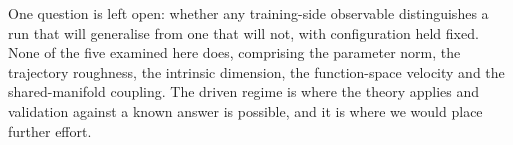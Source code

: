 \documentclass{article}
\begin{document}
One question is left open: whether any training-side observable distinguishes a run that
will generalise from one that will not, with configuration held fixed. None of the five
examined here does, comprising the parameter norm, the trajectory roughness, the intrinsic
dimension, the function-space velocity and the shared-manifold coupling. The driven regime
is where the theory applies and validation against a known answer is possible, and it is
where we would place further effort.



\end{document}
